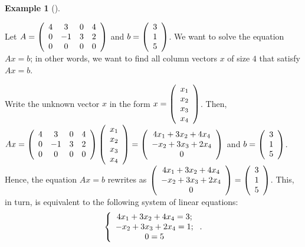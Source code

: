 \documentclass[numbers=enddot,12pt,final,onecolumn,notitlepage]{scrartcl}%
\theoremstyle{definition}
\newtheorem{exam}[theo]{Example}
\newenvironment{example}[1][]
{\begin{exam}[#1]\begin{leftbar}}
{\end{leftbar}\end{exam}}
\begin{document}
\begin{example}
\label{exam.row-echelon.backsub.3}Let $A=\left(
\begin{array}
[c]{cccc}%
4 & 3 & 0 & 4\\
0 & -1 & 3 & 2\\
0 & 0 & 0 & 0
\end{array}
\right)  $ and $b=\left(
\begin{array}
[c]{c}%
3\\
1\\
5
\end{array}
\right)  $. We want to solve the equation $Ax=b$; in other words, we want to
find all column vectors $x$ of size $4$ that satisfy $Ax=b$.

Write the unknown vector $x$ in the form $x=\left(
\begin{array}
[c]{c}%
x_{1}\\
x_{2}\\
x_{3}\\
x_{4}%
\end{array}
\right)  $. Then, $Ax=\left(
\begin{array}
[c]{cccc}%
4 & 3 & 0 & 4\\
0 & -1 & 3 & 2\\
0 & 0 & 0 & 0
\end{array}
\right)  \left(
\begin{array}
[c]{c}%
x_{1}\\
x_{2}\\
x_{3}\\
x_{4}%
\end{array}
\right)  =\left(
\begin{array}
[c]{c}%
4x_{1}+3x_{2}+4x_{4}\\
-x_{2}+3x_{3}+2x_{4}\\
0
\end{array}
\right)  $ and $b=\left(
\begin{array}
[c]{c}%
3\\
1\\
5
\end{array}
\right)  $. Hence, the equation $Ax=b$ rewrites as $\left(
\begin{array}
[c]{c}%
4x_{1}+3x_{2}+4x_{4}\\
-x_{2}+3x_{3}+2x_{4}\\
0
\end{array}
\right)  =\left(
\begin{array}
[c]{c}%
3\\
1\\
5
\end{array}
\right)  $. This, in turn, is equivalent to the following system of linear
equations:%
\begin{equation}
\left\{
\begin{array}
[c]{c}%
4x_{1}+3x_{2}+4x_{4}=3;\\
-x_{2}+3x_{3}+2x_{4}=1;\\
0=5
\end{array}
\right.  . \label{eq.exam.row-echelon.backsub.3.sys}%
\end{equation}



\end{example}
\end{document}
